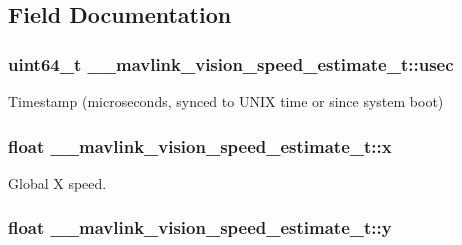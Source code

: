 \subsection{Field Documentation}
\hypertarget{struct____mavlink__vision__speed__estimate__t_adfc952857e519d31dfaa6f3cdd153843}{
\subsubsection[{usec}]{\setlength{\rightskip}{0pt plus 5cm}uint64\+\_\+t \+\_\+\+\_\+mavlink\+\_\+vision\+\_\+speed\+\_\+estimate\+\_\+t\+::usec}}\label{struct____mavlink__vision__speed__estimate__t_adfc952857e519d31dfaa6f3cdd153843}


Timestamp (microseconds, synced to U\+N\+I\+X time or since system boot) 

\hypertarget{struct____mavlink__vision__speed__estimate__t_a8fcd91c8bacb70d5b1bd6df87fb01a5a}{
\subsubsection[{x}]{\setlength{\rightskip}{0pt plus 5cm}float \+\_\+\+\_\+mavlink\+\_\+vision\+\_\+speed\+\_\+estimate\+\_\+t\+::x}}\label{struct____mavlink__vision__speed__estimate__t_a8fcd91c8bacb70d5b1bd6df87fb01a5a}


Global X speed. 

\hypertarget{struct____mavlink__vision__speed__estimate__t_ae2bcf3949b4e0ac7d21b4bc886fea08c}{
\subsubsection[{y}]{\setlength{\rightskip}{0pt plus 5cm}float \+\_\+\+\_\+mavlink\+\_\+vision\+\_\+speed\+\_\+estimate\+\_\+t\+::y}}\label{struct____mavlink__vision__speed__estimate__t_ae2bcf3949b4e0ac7d21b4bc886fea08c}


